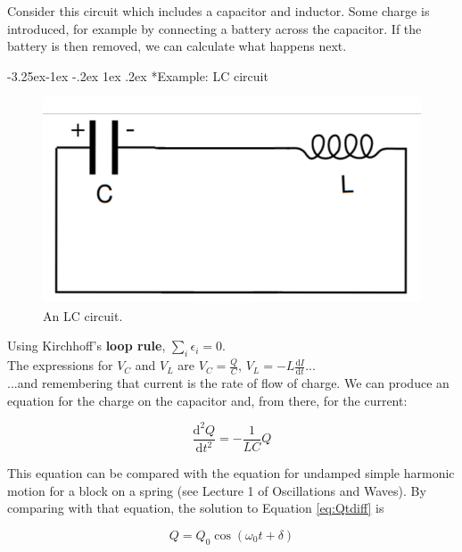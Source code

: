 \documentclass[
]{book}
\makeatletter
\renewcommand\subsection{%
\@startsection{subsection}{2}{\z@}%
              {-3.25ex\@plus -1ex \@minus -.2ex}%
              {1ex \@plus .2ex}%
              {\sffamily\bfseries}}
\numberwithin{equation}{section}
\makeatother
\begin{document}
Consider this circuit which includes a capacitor and inductor. Some
charge is introduced, for example by connecting a battery across the
capacitor. If the battery is then removed, we can calculate what happens
next.

\hypertarget{example-lc-circuit}{%
\subsection*{Example: LC circuit}\label{example-lc-circuit}}

\begin{figure}

{\centering \includegraphics[width=0.7\linewidth]{Figures/LC_circuit} 

}

\caption{An LC circuit.}\label{fig:LCcircuit}
\end{figure}

Using Kirchhoff's \textbf{loop rule}, \(\sum_i \epsilon_i = 0\).\\
The expressions for \(V_C\) and \(V_L\) are \(V_C = \frac{Q}{C}\),
\(V_L = -L \frac{\mathrm{d} I}{\mathrm{d} t}\)...\\
...and remembering that current is the rate of flow of charge. We can
produce an equation for the charge on the capacitor and, from there, for
the current:

\begin{equation}
\label{eq:QtDiff}
\frac{\mathrm{d}^2 Q}{\mathrm{d} t^2} = - \frac{1}{LC} Q
\end{equation}

This equation can be compared with the equation for undamped simple
harmonic motion for a block on a spring (see Lecture 1 of Oscillations
and Waves). By comparing with that equation, the solution to Equation \eqref{eq:Qtdiff} is

\begin{equation}
\label{eq:Qsolution}
Q = Q_0 \cos⁡(\omega_0 t + \delta)
\end{equation}
\end{document}
